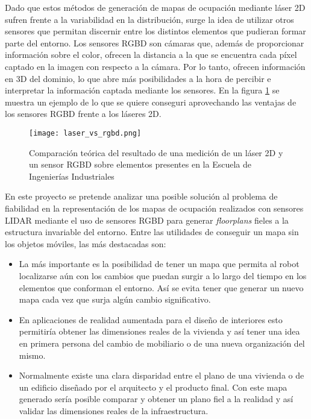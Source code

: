 Dado que estos métodos de generación de mapas de ocupación mediante láser 2D sufren frente a la variabilidad en la distribución, surge la idea de utilizar otros sensores que permitan discernir entre los distintos elementos que pudieran formar parte del entorno. Los sensores RGBD son cámaras que, además de proporcionar información sobre el color, ofrecen la distancia a la que se encuentra cada píxel captado en la imagen con respecto a la cámara. Por lo tanto, ofrecen información en 3D del dominio, lo que abre más posibilidades a la hora de percibir e interpretar la información captada mediante los sensores. En la figura \ref{fig:laser_vs_rgbd} se muestra un ejemplo de lo que se quiere conseguri aprovechando las ventajas de los sensores RGBD frente a los láseres 2D.\\

\begin{figure}[H]
	\begin{center} 
	\texttt{[image: laser\_vs\_rgbd.png]}
	\end{center}
	\caption{Comparación teórica del resultado de una medición de un láser 2D y un sensor RGBD sobre elementos presentes en la Escuela de Ingenierías Industriales}
	\label{fig:laser_vs_rgbd}
\end{figure}

En este proyecto se pretende analizar una posible solución al problema de fiabilidad en la representación de los mapas de ocupación realizados con sensores LIDAR mediante el uso de sensores RGBD para generar \textit{floorplans} fieles a la estructura invariable del entorno. Entre las utilidades de conseguir un mapa sin los objetos móviles, las más destacadas son:

\begin{itemize}

	\item La más importante es la posibilidad de tener un mapa que permita al robot localizarse aún con los cambios que puedan surgir a lo largo del tiempo en los elementos que conforman el entorno. Así se evita tener que generar un nuevo mapa cada vez que surja algún cambio significativo.
	\item En aplicaciones de realidad aumentada para el diseño de interiores esto permitiría obtener las dimensiones reales de la vivienda y así tener una idea en primera persona del cambio de mobiliario o de una nueva organización del mismo.
	\item Normalmente existe una clara disparidad entre el plano de una vivienda o de un edificio diseñado por el arquitecto y el producto final. Con este mapa generado sería posible comparar y obtener un plano fiel a la realidad y así validar las dimensiones reales de la infraestructura.

\end{itemize}



